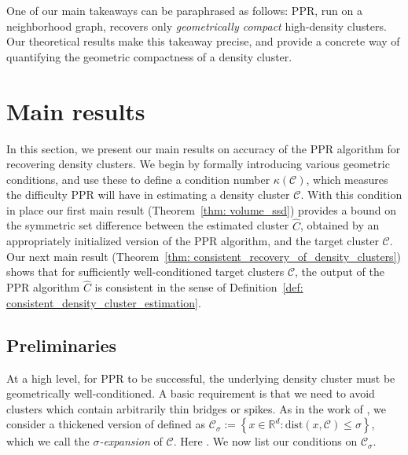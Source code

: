 \documentclass[11pt,twoside]{article}
\newcommand{\set}[1]{\left\{#1\right\}}
\newcommand{\Reals}{\mathbb{R}}
\newcommand{\norm}[1]{\left\lVert#1\right\rVert}
\newcommand{\1}{\mathbbm{1}}
\newcommand{\dist}{\mathrm{dist}}
\newcommand{\Cbb}{\mathbb{C}}
\newcommand{\Cset}{\mathcal{C}}
\newcommand{\Csig}{\Cset_{\sigma}}
\newcommand{\Cest}{\widehat{C}}
\begin{document}
One of our main takeaways can be paraphrased as follows: PPR, run on a
neighborhood graph, recovers only \emph{geometrically compact} high-density
clusters. Our theoretical results make this takeaway precise, and provide a 
concrete way of quantifying the geometric compactness of a density 
cluster.  

\section{Main results}
\label{sec: consistent_cluster_estimation_with_ppr}

In this section, we present our main results on accuracy of the PPR algorithm
for recovering density clusters.  We begin by formally introducing various
geometric conditions, and use these to define a condition number
$\kappa(\Cset)$, which measures the difficulty PPR will have in estimating a
density cluster $\Cset$. With this condition in place our first main result
(Theorem~\ref{thm: volume_ssd}) provides a bound on the symmetric set difference
between the estimated cluster $\Cest$, obtained by an appropriately initialized 
version of the PPR algorithm, and the target cluster $\Cset$.  Our next main
result (Theorem~\ref{thm: consistent_recovery_of_density_clusters}) shows that
for sufficiently well-conditioned target clusters $\Cset$, the output of the PPR
algorithm $\Cest$ is consistent in the sense of Definition~\ref{def:
consistent_density_cluster_estimation}.

\subsection{Preliminaries}

At a high level, for PPR to be successful, the underlying density cluster must
be geometrically well-conditioned.  A basic requirement is that we need to avoid
clusters which contain arbitrarily thin bridges or spikes. As in the work of
\citet{chaudhuri2010}, we consider a thickened version of \smash{$\Cset \in
\Cbb_f(\lambda)$} defined as $\Csig := \set{x \in \Reals^d: \dist(x,\Cset) \leq
\sigma}$, which we call the \emph{$\sigma$-expansion} of $\Cset$. Here
\smash{$\dist(x,\Cset) := \inf_{y \in \Cset} \norm{y - x}$}.  We now list our
conditions on $\Csig$.
\end{document}
